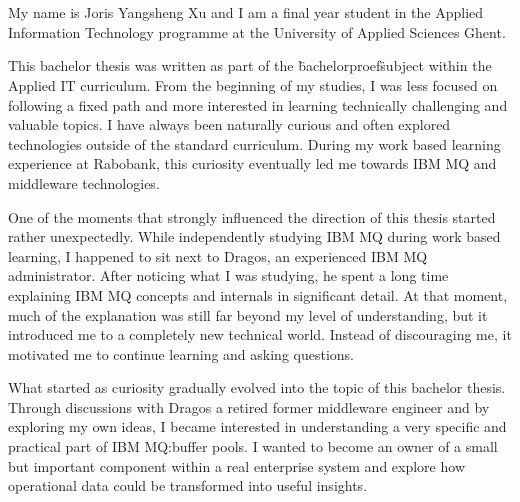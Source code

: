
\chapter*{}%
\label{ch:voorwoord}




My name is Joris Yangsheng Xu and I am a final year student in the Applied Information Technology programme at the University of Applied Sciences Ghent. 

This bachelor thesis was written as part of the \"bachelorproef\" subject within the Applied IT curriculum.
From the beginning of my studies, I was less focused on following a fixed path and more interested in learning technically challenging and valuable topics. 
I have always been naturally curious and often explored technologies outside of the standard curriculum. 
During my work based learning experience at Rabobank, this curiosity eventually led me towards IBM MQ and middleware technologies.

One of the moments that strongly influenced the direction of this thesis started rather unexpectedly. 
While independently studying IBM MQ during work based learning, I happened to sit next to Dragos, an experienced IBM MQ administrator. 
After noticing what I was studying, he spent a long time explaining IBM MQ concepts and internals in significant detail. 
At that moment, much of the explanation was still far beyond my level of understanding, but it introduced me to a completely new technical world. 
Instead of discouraging me, it motivated me to continue learning and asking questions.

What started as curiosity gradually evolved into the topic of this bachelor thesis. 
Through discussions with Dragos a retired former middleware engineer and by exploring my own ideas, I became interested in understanding a very specific and practical part of IBM MQ:\@ buffer pools. 
I wanted to become an owner of a small but important component within a real enterprise system and explore how operational data could be transformed into useful insights.

